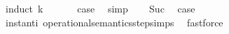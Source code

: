 \begin{isabellebody}
\isadelimproof
%
\endisadelimproof
%
\isatagproof
{}\isamarkupfalse%
\ {\isacharparenleft}induct\ k{\isacharparenright}\isanewline
\ \ \isamarkupfalse%
\ {}\ \isamarkupfalse%
\ {\isacharquery}case\ \isamarkupfalse%
\ simp\isanewline
{}\isamarkupfalse%
\isanewline
\ \ \isamarkupfalse%
\ Suc\ \isamarkupfalse%
\ {\isacharquery}case\isanewline
\ \ \ \ \isamarkupfalse%
\ instant{\isacharunderscore}i\ operational{\isacharunderscore}semantics{\isacharunderscore}step{\isachardot}simps\ \isamarkupfalse%
\ fastforce\ \isanewline
{}\isamarkupfalse%
%
\endisatagproof
{\isafoldproof}%
%
\isadelimproof
\isanewline
%
\endisadelimproof
%
\isadelimtheory
\isanewline
%
\endisadelimtheory
%
\isatagtheory
{}\isamarkupfalse%
%
\endisatagtheory
{\isafoldtheory}%
%
\isadelimtheory
%
\endisadelimtheory
%
\end{isabellebody}%
\endinput
